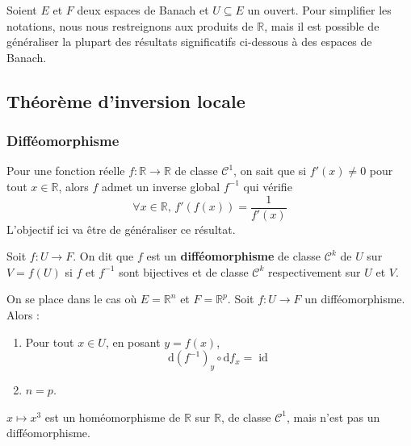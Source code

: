 




	Soient $E$ et $F$ deux espaces de Banach et $U \subseteq E$ un ouvert. Pour simplifier les notations, nous nous restreignons aux produits de $\mathbb{R}$, mais il est possible de généraliser la plupart des résultats significatifs ci-dessous à des espaces de Banach.

	\subsection{Théorème d'inversion locale}

	\subsubsection{Difféomorphisme}


	Pour une fonction réelle $f : \mathbb{R} \rightarrow \mathbb{R}$ de classe $\mathcal{C}^1$, on sait que si $f'(x) \neq 0$ pour tout $x \in \mathbb{R}$, alors $f$ admet un inverse global $f^{-1}$ qui vérifie
	\[ \forall x \in \mathbb{R}, \, f'(f(x)) = \frac{1}{f'(x)} \]
	L'objectif ici va être de généraliser ce résultat.


	\begin{definition}
		Soit $f : U \rightarrow F$. On dit que $f$ est un \textbf{difféomorphisme} de classe $\mathcal{C}^k$ de $U$ sur $V = f(U)$ si $f$ et $f^{-1}$ sont bijectives et de classe $\mathcal{C}^k$ respectivement sur $U$ et $V$.
	\end{definition}

	\begin{proposition}
		On se place dans le cas où $E = \mathbb{R}^n$ et $F = \mathbb{R}^p$. Soit $f : U \rightarrow F$ un difféomorphisme. Alors :
		\begin{enumerate}[label=(\roman*)]
			\item Pour tout $x \in U$, en posant $y = f(x)$,
			\[ \mathrm{d}(f^{-1})_y \circ \mathrm{d}f_x = \operatorname{id} \]
			\item $n=p$.
		\end{enumerate}
	\end{proposition}

	\begin{example}
		$x \mapsto x^3$ est un homéomorphisme de $\mathbb{R}$ sur $\mathbb{R}$, de classe $\mathcal{C}^1$, mais n'est pas un difféomorphisme.
	\end{example}

